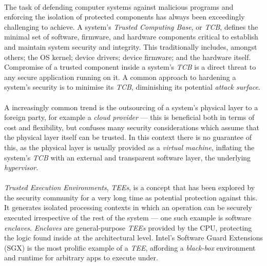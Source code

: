 


\paragraph{} The task of defending computer systems against malicious programs and enforcing the isolation of protected components has always been exceedingly challenging to achieve. A system's \textit{Trusted Computing Base}, or \textit{TCB}, defines the minimal set of software, firmware, and hardware components critical to establish and maintain system security and integrity. This traditionally includes, amongst others; the OS kernel; device drivers; device firmware; and the hardware itself. Compromise of a trusted component inside a system's \textit{TCB} is a direct threat to any secure application running on it. A common approach to hardening a system's security is to minimise its \textit{TCB}, diminishing its potential \textit{attack surface}. 

\paragraph{} A increasingly common trend is the outsourcing of a system's physical layer to a foreign party, for example a \textit{cloud provider} --- this is beneficial both in terms of cost and flexibility, but confuses many security considerations which assume that the physical layer itself can be trusted. In this context there is no guarantee of this, as the physical layer is usually provided as a \textit{virtual machine}, inflating the system's \textit{TCB} with an external and transparent software layer, the underlying \textit{hypervisor}.

\paragraph{} \textit{Trusted Execution Environments}, \textit{TEEs}, is a concept that has been explored by the security community for a very long time as potential protection against this. It generates isolated processing contexts in which an operation can be securely executed irrespective of the rest of the system --- one such example is software \textit{enclaves}. \textit{Enclaves} are general-purpose \textit{TEEs} provided by the CPU, protecting the logic found inside at the architectural level. Intel's Software Guard Extensions (SGX) is the most prolific example of a \textit{TEE}, affording a \textit{black-box} environment and runtime for arbitrary apps to execute under.

